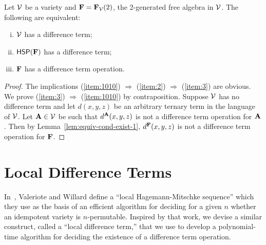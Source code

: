 
\begin{thm}
  \label{thm:F}
Let $\mathcal{V}$ be a variety and $\mathbf{F} = \mathbf{F}_{\mathcal{V}}(2)$, the 2-generated
free algebra in $\mathcal{V}$. The following are equivalent:
\begin{enumerate}[(i)]
\item \label{item:1010}
  $\mathcal{V}$ has a difference term;
\item \label{item:2}
  $\mathsf{H} \mathsf{S} \mathsf{P} (\mathbf{F})$ has a difference term;
\item \label{item:3}
  $\mathbf{F}$ has a difference term operation.
\end{enumerate}
\end{thm}
\begin{proof}
  The implications
  (\ref{item:1010}) $\Rightarrow$  (\ref{item:2}) $\Rightarrow$  (\ref{item:3}) are
  obvious. We prove
  (\ref{item:3}) $\Rightarrow$  (\ref{item:1010}) by contraposition.
  Suppose $\mathcal{V}$ has no difference term and let
  $d(x,y,z)$ be an arbitrary ternary term in the language of $\mathcal{V}$.
  Let $\mathbf{A}\in \mathcal{V}$ be such that $d^{\mathbf{A}}(x,y,z)$ is not a difference term
  operation for $\mathbf{A}$. Then by Lemma~\ref{lem:equiv-cond-exist-1}, $d^{\mathbf{F}}(x,y,z)$ 
  is not a difference term operation for $\mathbf{F}$.
\end{proof}

\section{Local Difference Terms}
\label{sec:local-diff-terms}
In~\cite{MR3239624},
Valeriote and Willard define %
a ``local Hagemann-Mitschke sequence'' which they use as the basis of
an efficient algorithm for deciding for a given $n$ whether an idempotent
variety is $n$-permutable. 
Inspired by that work, we devise a similar construct, called
a ``local difference term,'' that we use to develop a polynomial-time
algorithm for deciding the existence of a difference term operation.

